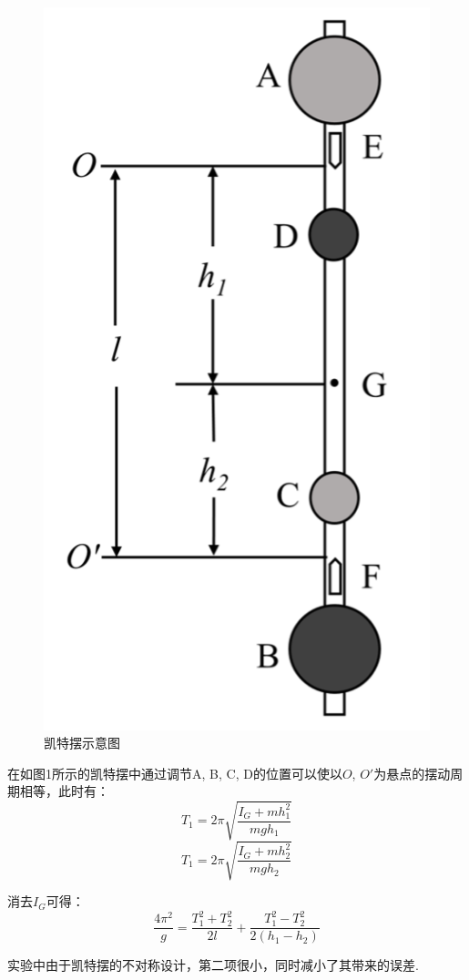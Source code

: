 \documentclass[UTF8]{ctexart}
\begin{document}
\begin{figure}[H]
  \centering
  \includegraphics[scale=0.7]{p1.png}
  \caption{凯特摆示意图}
\end{figure}

在如图1所示的凯特摆中通过调节A, B, C, D的位置可以使以$O$, $O'$为悬点的摆动周期相等，此时有：
\[T_1 = 2\pi \sqrt{\frac{I_G+mh_1^2}{mgh_1}}\]
\[T_1 = 2\pi \sqrt{\frac{I_G+mh_2^2}{mgh_2}}\]

消去$I_G$可得：
\[\frac{4 \pi^2}{g} = \frac{T_1^2+T_2^2}{2l}+\frac{T_1^2-T_2^2}{2\left(h_1-h_2\right)}\]

实验中由于凯特摆的不对称设计，第二项很小，同时减小了其带来的误差.
\end{document}
